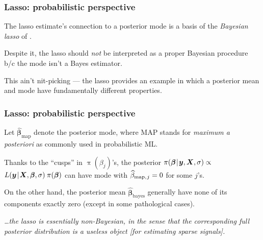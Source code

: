 \documentclass[18pt]{beamer}
\renewcommand{\textsc}[1]{{\small \MakeUppercase{#1}}}
\newcommand{\given}{\thinnerspace | \thinnerspace}
\newcommand{\thinnerspace}{\mskip.5\thinmuskip}
\newcommand{\density}{\operatorname{\pi}}
\newcommand{\likelihood}{L}
\newcommand{\by}{\bm{y}}
\newcommand{\bX}{\bm{X}}
\newcommand{\bbeta}{\bm{\beta}}
\begin{document}
\begin{frame}
\frametitle{Lasso: probabilistic perspective}
The lasso estimate's connection to a posterior mode is a basis of the \textit{Bayesian lasso} of \cite{park2008bayesian_lasso}.

\pause
\smallskip
Despite it, the lasso should \textit{not} be interpreted as a proper Bayesian procedure b/c the mode isn't a Bayes estimator.

\pause
\smallskip
This ain't nit-picking --- the lasso provides an example in which a posterior mean and mode have fundamentally different properties.
\end{frame}


\begin{frame}
\frametitle{Lasso: probabilistic perspective}
Let $\widehat{\bbeta}_{\mathrm{map}}$ denote the posterior mode, where \textsc{MAP} stands for \textit{maximum a posteriori} as commonly used in probabilistic \textsc{ML}.

\pause
\smallskip
Thanks to the ``cusps'' in $\density(\beta_j)$'s, the posterior $\density(\bbeta \given \by, \bX, \sigma) \propto$ $\likelihood(\by \given \bX, \bbeta, \sigma) \thinnerspace \density(\bbeta)$ can have mode with $\widehat{\beta}_{\mathrm{map}, \thinnerspace j} = 0$ for some $j$'s.

\pause
\smallskip
On the other hand, the posterior mean $\widehat{\bbeta}_{\mathrm{bayes}}$ generally have none of its components exactly zero (except in some pathological cases).

\pause
\begin{center}
\begin{minipage}{.88\linewidth}
{\slshape
\ldots the lasso is essentially non-Bayesian, in the sense that the corresponding full posterior distribution is a useless object [for estimating sparse signals].}
\hfill \citep{castillo2015bayes_sparse_reg}
\end{minipage}
\end{center}
\end{frame}
\end{document}
